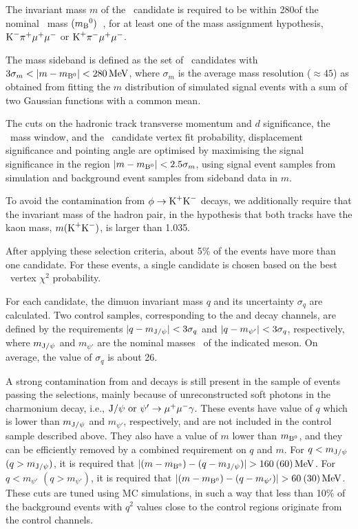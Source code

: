 The invariant mass $m$ of the \PBz\ candidate is required to be within 280\MeV of the nominal \PBz\ mass $(m_{\textrm{B}}{}^{0})$~\cite{PDG}, for at least one of the mass assignment hypothesis, $\textrm{K}^{-}\pi^{+}\mu^{+}\mu^{-}$ or $\textrm{K}^{+}\pi^{-}\mu^{+}\mu^{-}$.

The mass sideband is defined as the set of \PBz\ candidates with $3\sigma_m < \lvert m-m_{{\textrm{B}}{}^{0}}\rvert < 280\,\textrm{MeV}$, where $\sigma_m$ is the average mass resolution (${\approx}45$\MeV) as obtained from fitting the $m$ distribution of simulated signal events with a sum of two Gaussian functions with a common mean.

The cuts on the hadronic track transverse momentum and $d$ significance, the \cPKstz\ mass window, and the \PBz\ candidate vertex fit probability, displacement significance and pointing angle are optimised by maximising the signal significance in the region $\lvert m-m_{{\textrm{B}}{}^{0}}\rvert < 2.5\sigma_m$, using signal event samples from simulation and background event samples from sideband data in $m$.

To avoid the contamination from $\phi\to\textrm{K}^{+}\textrm{K}^{-}$ decays, we additionally require that the invariant mass of the hadron pair, in the hypothesis that both tracks have the kaon mass, $m(\textrm{K}^{+}\textrm{K}^{-})$, is larger than 1.035\GeV.

After applying these selection criteria, about 5\% of the events have more than one candidate.
For these events, a single candidate is chosen based on the best \PBz\ vertex $\chi^2$ probability.

For each candidate, the dimuon invariant mass $q$ and its uncertainty $\sigma_{q}$ are calculated.
Two control samples, corresponding to the \BtoKstJpsi and \BtoKstpsip decay channels, are defined by the requirements $\lvert q - m_{\textrm{J}/\psi}\rvert < 3\sigma_{q}$ and $\lvert q - m_{\psi'}\rvert < 3\sigma_{q}$, respectively, where $m_{\textrm{J}/\psi}$ and $m_{\psi'}$ are the nominal masses~\cite{PDG} of the indicated meson.
On average, the value of $\sigma_{q}$ is about 26\MeV.

A strong contamination from \BtoKstJpsi and \BtoKstpsip decays is still present in the sample of events passing the selections, mainly because of unreconstructed soft photons in the charmonium decay, i.e., $\textrm{J}/\psi\ {\rm or}\ \psi' \to \mu^{+} \mu^{-} \gamma$.
These events have value of $q$ which is lower than $m_{\textrm{J}/\psi}$ and $m_{\psi'}$, respectively, and are not included in the control sample described above.
They also have a value of $m$ lower than $m_{{\textrm{B}}{}^{0}}$, and they can be efficiently removed by a combined requirement on $q$ and $m$.
For $q<m_{\textrm{J}/\psi}$ $(q>m_{\textrm{J}/\psi})$, it is required that $\lvert(m-m_{{\textrm{B}}{}^{0}})-(q-m_{\textrm{J}/\psi})\rvert>160\: (60)\,\textrm{MeV}$.
For $q<m_{\psi'}$ $(q>m_{\psi'})$, it is required that $\lvert(m-m_{{\textrm{B}}{}^{0}})-(q-m_{\psi'})\rvert>60\: (30)\,\textrm{MeV}$.
These cuts are tuned using MC simulations, in such a way that less than 10\% of the background events with $q^2$ values close to the control regions originate from the control channels.

